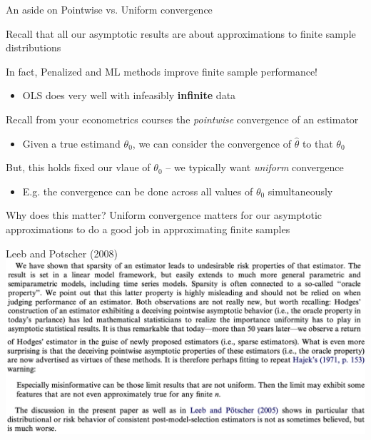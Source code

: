 \documentclass[notes,11pt, aspectratio=169]{beamer}
\newenvironment{wideitemize}{\itemize\addtolength{\itemsep}{10pt}}{\enditemize}
\begin{document}
\begin{frame}{An aside on Pointwise vs. Uniform convergence}
  \begin{wideitemize}
    \item Recall that all our asymptotic results are about approximations to finite sample distributions
    \item In fact, Penalized and ML methods improve finite sample performance!
      \begin{itemize}
      \item OLS does very well with infeasibly \textbf{infinite} data
      \end{itemize}
    \item Recall from your econometrics courses the
      \emph{pointwise} convergence of an estimator
      \begin{itemize}
      \item Given a true estimand $\theta_{0}$, we can consider the
        convergence of $\hat{\theta}$ to that $\theta_{0}$
      \end{itemize}
    \item But, this holds fixed our vlaue of $\theta_{0}$ -- we
      typically want \emph{uniform} convergence
      \begin{itemize}
      \item E.g. the convergence can be done across all values of
        $\theta_{0}$ simultaneously
      \end{itemize}
    \item Why does this matter? Uniform convergence matters for
      our asymptotic approximations to do a good job in approximating
      finite samples
  \end{wideitemize}
\end{frame}

\begin{frame}{Leeb and Potscher (2008)}
  \includegraphics[width=\linewidth]{leebpotscher2.png}\\
  \includegraphics[width=\linewidth]{leebpotscher3.png}
\end{frame}
\end{document}

